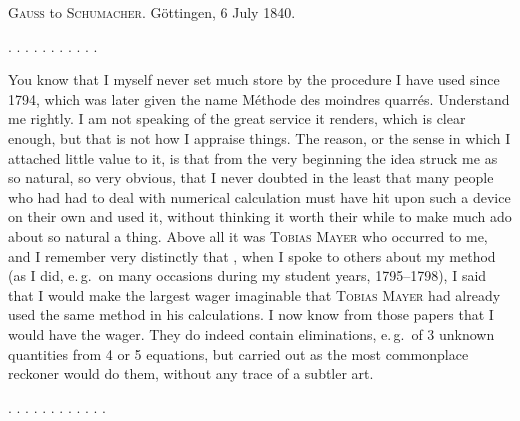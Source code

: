 \clearpage
{}
\begin{center}
\textsc{Gauss} to \textsc{Schumacher}. Göttingen, 6 July 1840.
\end{center}

\noindent . . . . . . . . . . .

You know that I myself never set much store by the procedure I have used since 1794, which was later given the name Méthode des moindres quarrés. Understand me rightly. I am not speaking of the great service it renders, which is clear enough, but that is not how I appraise things. The reason, or the sense in which I attached little value to it, is that from the very beginning the idea struck me as so natural, so very obvious, that I never doubted in the least that many people who had had to deal with numerical calculation must have hit upon such a device on their own and used it, without thinking it worth their while to make much ado about so natural a thing. Above all it was \textsc{Tobias Mayer} who occurred to me, and I remember very distinctly that , when I spoke to others about my method (as I did, e.\,g.\ on many occasions during my student years, 1795--1798), I said that I would make the largest wager imaginable that \textsc{Tobias Mayer} had already used the same method in his calculations. I now know from those papers that I would have  the wager. They do indeed contain eliminations, e.\,g.\ of 3 unknown quantities from 4 or 5 equations, but carried out as the most commonplace reckoner would do them, without any trace of a subtler art.

\noindent . . . . . . . . . . . .

